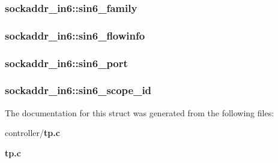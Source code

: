 \subsubsection[{sin6\_\-family}]{ {\bf sockaddr\_\-in6::sin6\_\-family}}\label{structsockaddr__in6_aefa41e43be9c615f8cfd6266c0ed1687}
\subsubsection[{sin6\_\-flowinfo}]{ {\bf sockaddr\_\-in6::sin6\_\-flowinfo}}\label{structsockaddr__in6_a4faf8571dc08f1ed214acfe06941954e}
\subsubsection[{sin6\_\-port}]{ {\bf sockaddr\_\-in6::sin6\_\-port}}\label{structsockaddr__in6_a1a1aec2c794e1b8d2fd8705fc20c881b}
\subsubsection[{sin6\_\-scope\_\-id}]{ {\bf sockaddr\_\-in6::sin6\_\-scope\_\-id}}\label{structsockaddr__in6_a90915190af45ba4f62e57ea662840f39}


The documentation for this struct was generated from the following files:\begin{DoxyCompactItemize}
\item 
controller/{\bf tp.c}\item 
{\bf tp.c}\end{DoxyCompactItemize}
